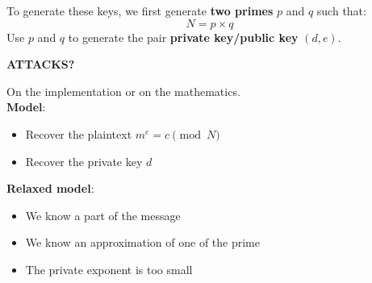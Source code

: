 \documentclass{beamer}
\begin{document}
\begin{frame}
To generate these keys, we first generate \textbf{two primes} $p$ and $q$ such that:
\[ N = p \times q \]
\pause
Use $p$ and $q$ to generate the pair \textbf{private key/public key} $(d,e)$.
\end{frame}

\fontsize{90pt}{15.2}\selectfont
{}
\begin{frame}
\begin{center}

\textbf{ATTACKS?}
\end{center}
\end{frame}

%
\fontsize{14pt}{15.2}\selectfont
\usebackgroundtemplate{}
\begin{frame}

On the implementation or on the mathematics.\\\vspace{1cm}
\pause
 \textbf{Model}:

\begin{itemize}
	\item{Recover the plaintext $m^e = c \pmod{N}$}
	\item{Recover the private key $d$}
\end{itemize}
\vspace{1cm}
\pause
\textbf{Relaxed model}:
\pause
\begin{itemize}
	\item{We know a part of the message}
	\item{We know an approximation of one of the prime}
	\item{The private exponent is too small}
\end{itemize}
\end{frame}
\end{document}
